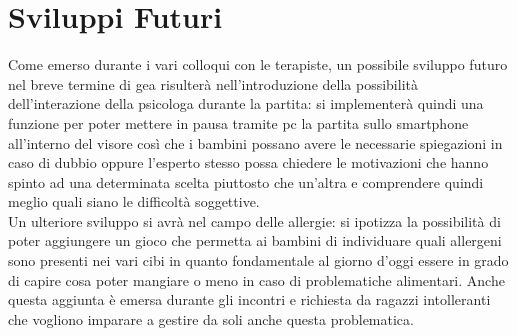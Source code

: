 \section{Sviluppi Futuri} \label{sec:svifut}
Come emerso durante i vari colloqui con le terapiste, un possibile sviluppo futuro nel breve termine di \acs{gea} risulterà nell'introduzione della possibilità dell'interazione della psicologa durante la partita: si implementerà quindi una funzione per poter mettere in pausa tramite pc la partita sullo smartphone all'interno del visore così che i bambini possano avere le necessarie spiegazioni in caso di dubbio oppure l'esperto stesso possa chiedere le motivazioni che hanno spinto ad una determinata scelta piuttosto che un'altra e comprendere quindi meglio quali siano le difficoltà soggettive.\\
Un ulteriore sviluppo si avrà nel campo delle allergie: si ipotizza la possibilità di poter aggiungere un gioco che permetta ai bambini di individuare quali allergeni sono presenti nei vari cibi in quanto fondamentale al giorno d'oggi essere in grado di capire cosa poter mangiare o meno in caso di problematiche alimentari. Anche questa aggiunta è emersa durante gli incontri e richiesta da ragazzi intolleranti che vogliono imparare a gestire da soli anche questa problematica.
